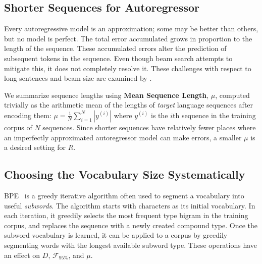 \subsection{Shorter Sequences for Autoregressor}
\label{sec:ar-short-seq}

Every autoregressive model is an approximation; some may be better than others, but no model is perfect.
The total error accumulated grows in proportion to the length of the sequence.
These accumulated errors alter the prediction of subsequent tokens in the sequence.
Even though beam search attempts to mitigate this, it does not completely resolve it.
These challenges with respect to long sentences and beam size are examined by .


We summarize sequence lengths using \textbf{Mean Sequence Length}, $\mu$,
computed trivially as the arithmetic mean of the lengths of \textit{target} language sequences after encoding them:
$\mu = \frac{1}{N} \sum_{i=1}^N |y^{(i)}|$
where $y^{(i)}$ is the $i$th sequence in the training corpus of $N$ sequences.
Since shorter sequences have relatively fewer places where an imperfectly approximated autoregressor model can make errors, a smaller $\mu$ is a desired setting for $R$.

\subsection{Choosing the Vocabulary Size Systematically}
\label{sec:bpe}

BPE~\cite{sennrich-etal-2016-bpe} is a greedy iterative algorithm often used to segment a vocabulary into useful \textit{subwords}.
The algorithm starts with characters as its initial vocabulary.
In each iteration, it greedily selects the most frequent type bigram in the training corpus, and replaces the sequence with a newly created compound type.
Once the subword vocabulary is learned, it can be applied to a corpus by greedily segmenting words with the longest available subword type. These operations have an effect on $D$, $\mathcal{F}_{95\%}$, and $\mu$.

